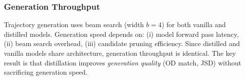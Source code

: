 \subsubsection{Generation Throughput}

Trajectory generation uses beam search (width $b=4$) for both vanilla and distilled models. Generation speed depends on: (i) model forward pass latency, (ii) beam search overhead, (iii) candidate pruning efficiency. Since distilled and vanilla models share architecture, generation throughput is identical. The key result is that distillation improves \emph{generation quality} (OD match, JSD) without sacrificing generation speed.


